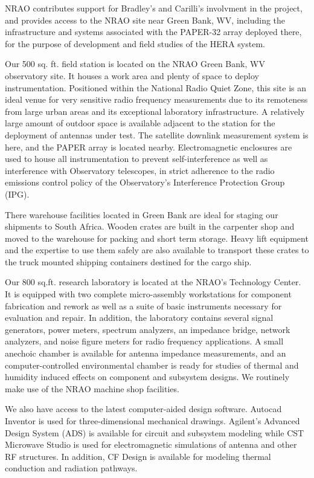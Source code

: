 \documentclass[11pt]{article}
\begin{document}
NRAO contributes support for Bradley's and Carilli's involvment in the
project, and provides access to the NRAO site near Green Bank, WV,
including the infrastructure and systems associated with the PAPER-32
array deployed there, for the purpose of development and field studies
of the HERA system.


Our 500 sq. ft. field station is located on the NRAO Green Bank, WV observatory
site. It houses a work area and plenty of space to deploy instrumentation.
Positioned within the National Radio Quiet Zone, this site is an ideal venue
for very sensitive radio frequency measurements due to its remoteness from
large urban areas and its exceptional laboratory infrastructure. A relatively
large amount of outdoor space is available adjacent to the station for the
deployment of antennas under test. The satellite downlink measurement system is
here, and the PAPER array is located nearby. Electromagnetic enclosures are
used to house all instrumentation to prevent self-interference as well as
interference with Observatory telescopes, in strict adherence to the radio
emissions control policy of the Observatory’s Interference Protection Group
(IPG).

There warehouse facilities located in Green Bank are ideal for staging our
shipments to South Africa. Wooden crates are built in the carpenter shop and
moved to the warehouse for packing and short term storage. Heavy lift
equipment and the expertise to use them safely are also available to transport
these crates to the truck mounted shipping containers destined for the cargo
ship.

Our 800 sq.ft. research laboratory is located at the NRAO’s Technology Center.
It is equipped with two complete micro-assembly workstations for component
fabrication and rework as well as a suite of basic instruments necessary for
evaluation and repair. In addition, the laboratory contains several signal
generators, power meters, spectrum analyzers, an impedance bridge, network
analyzers, and noise figure meters for radio frequency applications. A small
anechoic chamber is available for antenna impedance measurements, and an
computer-controlled environmental chamber is ready for studies of thermal and
humidity induced effects on component and subsystem designs. We routinely make
use of the NRAO machine shop facilities.

We also have access to the latest computer-aided design software. Autocad
Inventor is used for three-dimensional mechanical drawings. Agilent’s Advanced
Design System (ADS) is available for circuit and subsystem modeling while CST
Microwave Studio is used for electromagnetic simulations of antenna and other
RF structures. In addition, CF Design is available for modeling thermal
conduction and radiation pathways.
\end{document}
